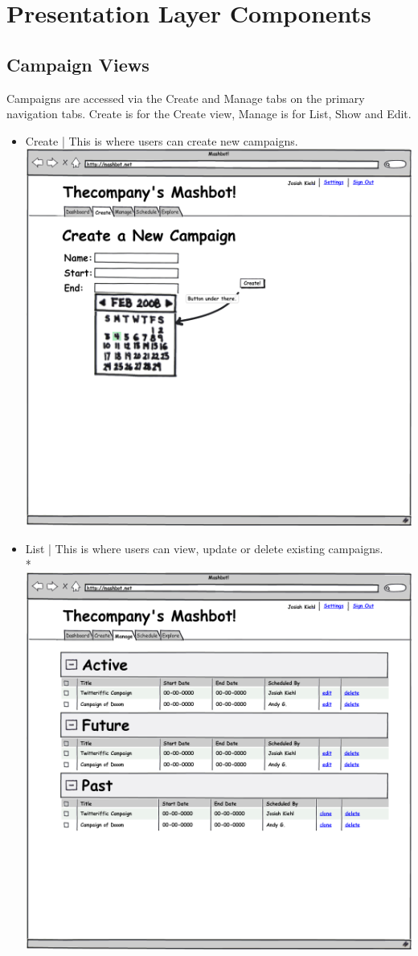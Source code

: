 \documentclass{report}
\begin{document}
\section{Presentation Layer Components}
\subsection{Campaign Views}
Campaigns are accessed via the Create and Manage tabs on the primary navigation tabs.  Create is for the Create view, Manage is for List, Show and Edit.
\begin{itemize}
\item Create | This is where users can create new campaigns.
  \includegraphics[width=\textwidth]{../mockups/create.png}
\item List | This is where users can view, update or delete existing campaigns. \\*
  \includegraphics[width=\textwidth]{../mockups/manage.png}

\end{itemize}
\end{document}
